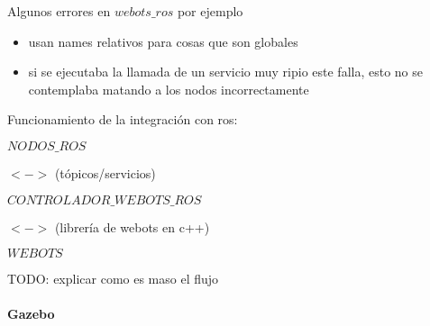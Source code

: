Algunos errores en $webots\_ros$ por ejemplo
\begin{itemize}
  \item usan names relativos para cosas que son globales
  \item si se ejecutaba la llamada de un servicio muy ripio este falla, esto no se contemplaba matando a los nodos incorrectamente
\end{itemize}

Funcionamiento de la integración con ros:

$NODOS\_ROS$

$<->$ (tópicos/servicios)

$CONTROLADOR\_WEBOTS\_ROS$

$<->$ (librería de webots en c++)

$WEBOTS$ 

TODO: explicar como es maso el flujo


\paragraph{Gazebo}
